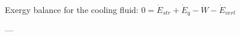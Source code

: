Exergy balance for the cooling fluid:  
\( 0 = \dot{E}_{str} + \dot{E}_{q} - \dot{W} - \dot{E}_{verl} \)  

---
